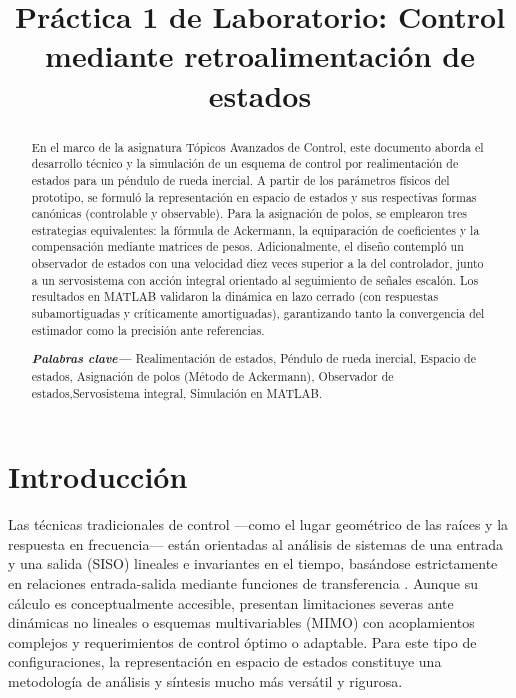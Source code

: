 \documentclass[conference]{IEEEtran}
\begin{document}
\title{ Práctica 1 de Laboratorio: Control mediante retroalimentación de estados }

\author{
}

\maketitle

\begin{abstract}
En el marco de la asignatura Tópicos Avanzados de Control, este documento aborda el desarrollo técnico y la simulación de un esquema de control por realimentación de estados para un péndulo de rueda inercial. A partir de los parámetros físicos del prototipo, se formuló la representación en espacio de estados y sus respectivas formas canónicas (controlable y observable). Para la asignación de polos, se emplearon tres estrategias equivalentes: la fórmula de Ackermann, la equiparación de coeficientes y la compensación mediante matrices de pesos. Adicionalmente, el diseño contempló un observador de estados con una velocidad diez veces superior a la del controlador, junto a un servosistema con acción integral orientado al seguimiento de señales escalón. Los resultados en MATLAB validaron la dinámica en lazo cerrado (con respuestas subamortiguadas y críticamente amortiguadas), garantizando tanto la convergencia del estimador como la precisión ante referencias.

\vspace{1em}
\noindent \textbf{\textit{Palabras clave---}} Realimentación de estados, Péndulo de rueda inercial, Espacio de estados, Asignación de polos (Método de Ackermann), Observador de estados,Servosistema integral, Simulación en MATLAB.
\end{abstract}

\section{Introducción}

Las técnicas tradicionales de control —como el lugar geométrico de las raíces y la respuesta en frecuencia— están orientadas al análisis de sistemas de una entrada y una salida (SISO) lineales e invariantes en el tiempo, basándose estrictamente en relaciones entrada-salida mediante funciones de transferencia \cite{ogata_discreto}. Aunque su cálculo es conceptualmente accesible, presentan limitaciones severas ante dinámicas no lineales o esquemas multivariables (MIMO) con acoplamientos complejos y requerimientos de control óptimo o adaptable. Para este tipo de configuraciones, la representación en espacio de estados constituye una metodología de análisis y síntesis mucho más versátil y rigurosa.
\end{document}
